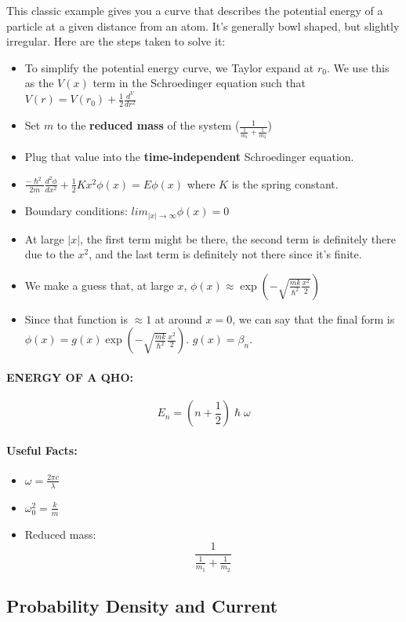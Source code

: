 \documentclass[a4paper,12pt]{report}
\begin{document}
This classic example gives you a curve that describes the potential energy of a particle at a given distance from an atom. It's generally bowl shaped, but slightly irregular. Here are the steps taken to solve it:

\begin{itemize}
\item To simplify the potential energy curve, we Taylor expand at $r_0$. We use this as the $V(x)$ term in the Schroedinger equation such that $V(r) = V(r_0) + \frac{1}{2}\frac{d^V}{dr^2}$
\item Set $m$ to the \textbf{reduced mass} of the system ($\frac{1}{\frac{1}{m_1} + \frac{1}{m_2}}$)
\item Plug that value into the \textbf{time-independent} Schroedinger equation.
\item $\frac{-\hslash^2}{2m} \frac{d^2\phi}{dx^2} + \frac{1}{2}Kx^2 \phi(x) = E\phi(x)$ where $K$ is the spring constant.
\item Boundary conditions: $lim_{|x|\to\infty}\phi(x) = 0$
\item At large $|x|$, the first term might be there, the second term is definitely there due to the $x^2$, and the last term is definitely not there since it's finite.
\item We make a guess that, at large $x$, $\phi(x) \approx \exp(-\sqrt{\frac{mk}{\hslash^2}\frac{x^2}{2}})$
\item Since that function is $\approx 1$ at around $x = 0$, we can say that the final form is $\phi(x) = g(x) \exp(-\sqrt{\frac{mk}{\hslash^2}}\frac{x^2}{2})$. $g(x) = \beta_n$.
\end{itemize}

\paragraph{ENERGY OF A QHO: } $$E_n = (n+\frac{1}{2})\hslash \omega$$
\paragraph{Useful Facts: }
\begin{itemize}
\item $\omega = \frac{2\pi c}{\lambda}$
\item $\omega_0^2 = \frac{k}{m}$
\item Reduced mass: $$\frac{1}{ \frac{1}{m_1} + \frac{1}{m_2} }$$
\end{itemize}

\subsection{Probability Density and Current}
\end{document}
